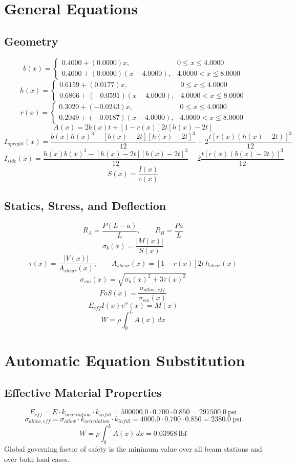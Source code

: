 \documentclass[11pt]{article}
\begin{document}
\section*{General Equations}
\subsection*{Geometry}
\[
b(x)=\begin{cases}0.4000 + (0.0000)x, & 0 \le x \le 4.0000\\0.4000 + (0.0000)(x-4.0000), & 4.0000 < x \le 8.0000\end{cases}
\]
\[
h(x)=\begin{cases}0.6159 + (0.0177)x, & 0 \le x \le 4.0000\\0.6866 + (-0.0591)(x-4.0000), & 4.0000 < x \le 8.0000\end{cases}
\]
\[
r(x)=\begin{cases}0.3020 + (-0.0243)x, & 0 \le x \le 4.0000\\0.2049 + (-0.0187)(x-4.0000), & 4.0000 < x \le 8.0000\end{cases}
\]
\[
A(x)=2b(x)t+[1-r(x)]2t[h(x)-2t]
\]
\[
I_{upright}(x)=\frac{b(x)h(x)^3-[b(x)-2t][h(x)-2t]^3}{12}-2\frac{t[r(x)(h(x)-2t)]^3}{12}
\]
\[
I_{side}(x)=\frac{h(x)b(x)^3-[h(x)-2t][b(x)-2t]^3}{12}-2\frac{t[r(x)(b(x)-2t)]^3}{12}
\]
\[
S(x)=\frac{I(x)}{c(x)}
\]

\subsection*{Statics, Stress, and Deflection}
\[
R_A=\frac{P(L-a)}{L}, \qquad R_B=\frac{Pa}{L}
\]
\[
\sigma_b(x)=\frac{|M(x)|}{S(x)}
\]
\[
\tau(x)=\frac{|V(x)|}{A_{shear}(x)}, \qquad A_{shear}(x)=[1-r(x)]2t\,h_{clear}(x)
\]
\[
\sigma_{vm}(x)=\sqrt{\sigma_b(x)^2+3\tau(x)^2}
\]
\[
FoS(x)=\frac{\sigma_{allow,eff}}{\sigma_{vm}(x)}
\]
\[
E_{eff}I(x)v''(x)=M(x)
\]
\[
W=\rho\int_0^L A(x)\,dx
\]

\section*{Automatic Equation Substitution}
\subsection*{Effective Material Properties}
\[E_{eff} = E \cdot k_{orientation} \cdot k_{infill} = 500000.0 \cdot 0.700 \cdot 0.850 = 297500.0\ \mathrm{psi}\]
\[\sigma_{allow,eff} = \sigma_{allow} \cdot k_{orientation} \cdot k_{infill} = 4000.0 \cdot 0.700 \cdot 0.850 = 2380.0\ \mathrm{psi}\]
\[W = \rho \int_0^L A(x)\,dx = 0.03968\ \mathrm{lbf}\]
Global governing factor of safety is the minimum value over all beam stations and over both load cases.
\end{document}
